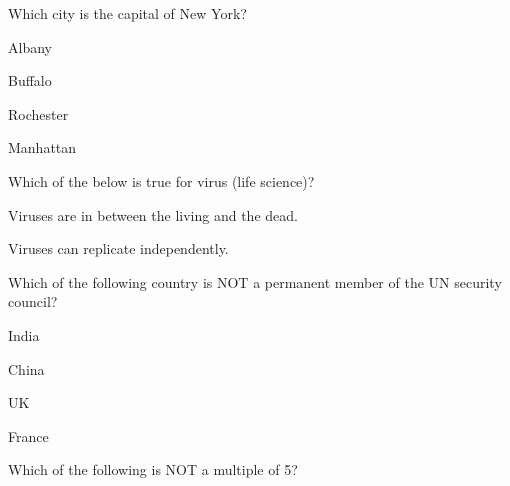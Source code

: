 \documentclass[12pt]{exam}
\begin{document}
\begin{questions}

    \question Which city is the capital of New York?
    
        \begin{oneparchoices}
        
            \choice Albany
        
            \choice Buffalo
        
            \choice Rochester
        
            \choice Manhattan
        
        \end{oneparchoices}

    \question Which of the below is true for virus (life science)?
    
        \begin{oneparchoices}
        
            \choice Viruses are in between the living and the dead.
        
            \choice Viruses can replicate independently.
        
        \end{oneparchoices}

    \question Which of the following country is NOT a permanent member of the 
        UN security council?
    
        \begin{oneparchoices}
        
            \choice India
        
            \choice China
        
            \choice UK
        
            \choice France
        
        \end{oneparchoices}

    \question Which of the following is NOT a multiple of 5?
    
        \begin{oneparchoices}
        
        
        
        
        
        \end{oneparchoices}


\end{questions}
\end{document}
